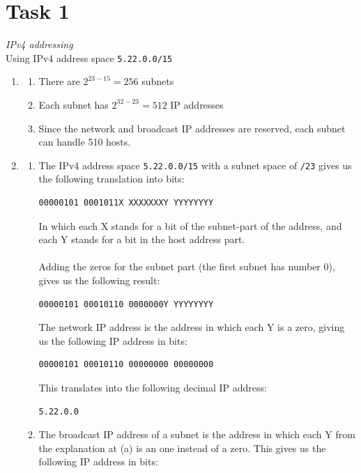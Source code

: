 \documentclass[12pt]{article}
\begin{document}
\section{Task 1}
\emph{\large IPv4 addressing} \\[0.3cm]
Using IPv4 address space \verb|5.22.0.0/15|
\begin{enumerate}
    \item \begin{enumerate}
            \item There are $2^{23-15} = 256$ subnets
            \item Each subnet has $2^{32-23} = 512$ IP addresses
            \item Since the network and broadcast IP addresses are
                reserved, each subnet can handle 510 hosts.
    \end{enumerate}
    \item \begin{enumerate}
        \item The IPv4 address space \verb|5.22.0.0/15| with a subnet space
            of \verb|/23| gives us the following translation into bits:
            \begin{verbatim}00000101 0001011X XXXXXXXY YYYYYYYY\end{verbatim}
            In which each X stands for a bit of the subnet-part of the
            address, and each Y stands for a bit in the host address part.
            \\ \\
            Adding the zeros for the subnet part (the first subnet has
            number 0), gives us the following result:
            \begin{verbatim}00000101 00010110 0000000Y YYYYYYYY\end{verbatim}
            The network IP address is the address in which each Y is a
            zero, giving us the following IP address in bits:
            \begin{verbatim}00000101 00010110 00000000 00000000\end{verbatim}
            \clearpage
            This translates into the following decimal IP address:
            \begin{verbatim}5.22.0.0\end{verbatim}
        \item The broadcast IP address of a subnet is the address in which
            each Y from the explanation at (a) is an one instead of a zero.
            This gives us the following IP address in bits:

\end{enumerate}
\end{enumerate}
\end{document}

